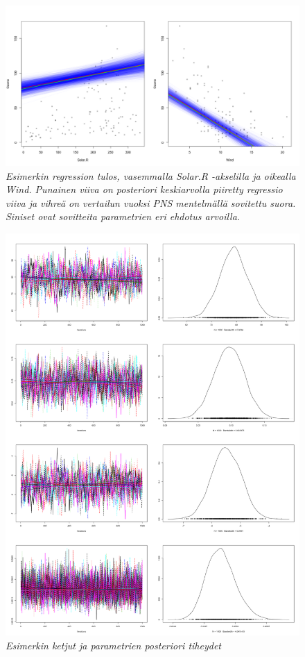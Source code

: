 \begin{figure}[h!]
	\includegraphics[width=\textwidth]{gibbsexample}
	\caption[Regressio]{\textit{Esimerkin regression tulos, vasemmalla Solar.R -akselilla ja oikealla Wind. Punainen viiva on posteriori keskiarvolla piiretty regressio viiva ja vihreä on vertailun vuoksi PNS mentelmällä sovitettu suora. Siniset ovat sovitteita parametrien eri ehdotus arvoilla.}}
	\label{kuva1}
\end{figure}

\begin{figure}[h!]
	\includegraphics[width=\textwidth]{gibbs2}
	\caption[]{\textit{Esimerkin ketjut ja parametrien posteriori tiheydet}}
	\label{kuva1}
\end{figure}



